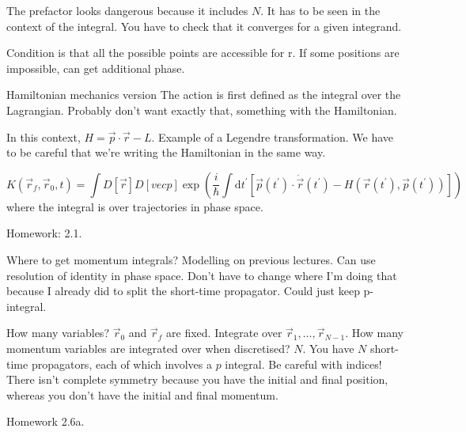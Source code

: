 \documentclass[a4paper]{extarticle}
\newcommand{\tpr}{t^\prime}
\newcommand{\dtpr}{\text{d}t^\prime}
\newcommand{\ihbar}{\frac{i}{\hbar}}
\newcommand{\propagator}{K(\vec{r}_f, \vec{r}_0, t)}
\begin{document}
The prefactor looks dangerous because it includes $N$.
It has to be seen in the context of the integral.
You have to check that it converges for a given integrand.

Condition is that all the possible points are accessible for r.
If some positions are impossible, can get additional phase.

Hamiltonian mechanics version The action is first defined as the integral over
the Lagrangian.
Probably don't want exactly that, something with the Hamiltonian.

In this context, $H = \vec{p}\cdot\vec{r} - L$.
Example of a Legendre transformation.
We have to be careful that we're writing the Hamiltonian in the same way.

\begin{equation}
  \propagator
  = \int D\left[\vec{r}\right] D\left[vec{p}\right]
  \exp\left(
  \ihbar \int \dtpr \left[
      \vec{p}(\tpr) \cdot \dot{\vec{r}}(\tpr) - H(\vec{r}(\tpr), \vec{p}(\tpr))
      \right]
  \right)
\end{equation}
where the integral is over trajectories in phase space.

Homework: 2.1.

Where to get momentum integrals?
Modelling on previous lectures.
Can use resolution of identity in phase space.
Don't have to change where I'm doing that because I already did to split the
short-time propagator.
Could just keep p-integral.

How many variables?
$\vec{r}_0$ and $\vec{r}_f$ are fixed.
Integrate over $\vec{r}_1, \dots, \vec{r}_{N - 1}$.
How many momentum variables are integrated over when discretised?
$N$.
You have $N$ short-time propagators, each of which involves a $p$ integral.
Be careful with indices!
There isn't complete symmetry because you have the initial and final position,
whereas you don't have the initial and final momentum.

Homework 2.6a.
\end{document}

